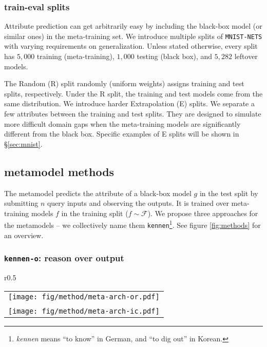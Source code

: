 \documentclass{article} %
\newcommand{\metamnist}{\texttt{MNIST-NETS}\xspace}
\newcommand{\kennen}{\texttt{kennen}\xspace}
\newcommand{\OR}{\texttt{kennen-o}\xspace}
\newcommand{\IC}{\texttt{kennen-i}\xspace}
\begin{document}
\subsubsection*{train-eval splits}

Attribute prediction can get arbitrarily easy by including the black-box model (or similar ones) in the meta-training set. We introduce multiple splits of \metamnist with varying requirements on generalization. Unless stated otherwise, every split has $5,000$ training (meta-training), $1,000$ testing (black box), and $5,282$ leftover models. 

The Random (R) split randomly (uniform weights) assigns training and test splits, respectively. Under the R split, the training and test models come from the same distribution. We introduce harder Extrapolation (E) splits. We separate a few attributes between the training and test splits. They are designed to simulate more difficult domain gaps when the meta-training models are significantly different from the black box. Specific examples of E splits will be shown in \S\ref{sec:mnist}.

\subsection{metamodel methods}

The metamodel predicts the attribute of a black-box model $g$ in the test split by submitting $n$ query inputs and observing the outputs. It is trained over meta-training models $f$ in the training split ($f\sim\mathcal{F}$). We propose three approaches for the metamodels -- we collectively name them \kennen\footnote{\emph{kennen} means ``to know'' in German, and ``to dig out'' in Korean.}. See figure \ref{fig:methods} for an overview.

\subsubsection*{\OR: reason over output}
\label{subsec:or}

\begin{wrapfigure}{r}{0.5\columnwidth}
\begin{centering}
\vspace{-1em}
\setlength{\tabcolsep}{0em}
\begin{tabular}{ l }
\texttt{[image: fig/method/meta-arch-or.pdf]}
\tabularnewline
\vspace{0em} \tabularnewline
\texttt{[image: fig/method/meta-arch-ic.pdf]}
\end{tabular}
\par\end{centering}
\caption{\label{fig:methods}Training procedure for metamodels \OR (top) and \IC (bottom).}
\vspace{-4em}
\end{wrapfigure}
\end{document}
